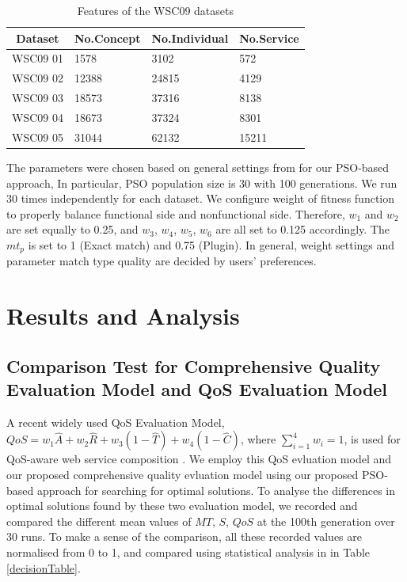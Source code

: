 \documentclass{llncs}
\begin{document}
\begin{table}[]
\centering
\caption{Features of the WSC09 datasets}
\label{wsc09datasetTable}
\begin{tabular}{l|l|l|l}
\hline
\multicolumn{1}{c|}{Dataset} & No.Concept & No.Individual & No.Service \\ \hline
WSC09 01                     & 1578       &3102           &572      \\ \hline
WSC09 02                     & 12388      &24815          &4129      \\ \hline
WSC09 03                     & 18573      &37316          &8138      \\ \hline
WSC09 04                     & 18673      &37324          &8301      \\ \hline
WSC09 05                     & 31044      &62132          &15211    \\ \hline
\end{tabular}
\end{table}

The parameters were chosen based on general settings from \cite{shi2001particle} for our PSO-based approach, In particular, PSO population size is 30 with 100 generations. We run 30 times independently for each dataset. We configure weight of fitness function to properly balance functional side and nonfunctional side. Therefore, $w_{1}$ and $w_{2}$ are set equally to 0.25, and $w_{3}$, $w_{4}$, $w_{5}$, $w_{6}$ are all set to 0.125 accordingly. The $mt_{p}$ is set to 1 (Exact match) and 0.75 (Plugin). In general, weight settings and parameter match type quality are decided by users' preferences.


\section{Results and Analysis}\label{results_analysis}
\subsection{Comparison Test for Comprehensive Quality Evaluation Model and QoS Evaluation Model}\label{comparisonTest}

A recent widely used QoS Evaluation Model, $QoS = w_1 \hat{A} + w_2 \hat{R} + w_3(1 - \hat{T}) + w_4(1 - \hat{C})$, where $\sum_{i=1}^{4} w_i = 1$, is used for QoS-aware web service composition \cite{ma2015hybrid,da2016particle,da2015graphevol}. We employ this QoS evluation model and our proposed comprehensive quality evluation model using our proposed PSO-based approach for searching for optimal solutions.
To analyse the differences in optimal solutions found by these two evaluation model, we recorded and compared the different mean values of $MT$, $S$, $QoS$ at the 100th generation over 30 runs. To make a sense of the comparison, all these recorded values are normalised from 0 to 1, and compared using statistical analysis in in Table \ref{decisionTable}. 
\end{document}
